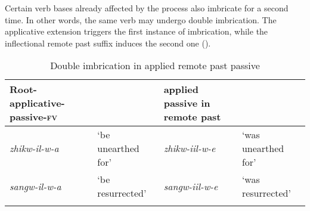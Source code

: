 \documentclass[output=paper]{langsci/langscibook}
\begin{document}
\begin{table}

\caption{Imbrication with vowel lengthening in remote past passive}
\label{tab:26.kawasha}

\end{table}

Certain verb bases already affected by the process also imbricate for a second time. In other words, the same verb may undergo double imbrication. The applicative extension triggers the first instance of imbrication, while the inflectional remote past suffix induces the second one ().

\begin{table} 
\small
\begin{tabularx}{\textwidth}{XlXl}
\lsptoprule
Root-applicative-passive-\textsc{fv} &  & applied passive in remote past & \\
\midrule
\textit{zhikw-il-w-a} & `be unearthed for' & \textit{zhikw-iil-w-e} & `was unearthed for' \\
\textit{sangw-il-w-a} & `be resurrected' & \textit{sangw-iil-w-e} & `was resurrected' \\

\lspbottomrule
\end{tabularx} 

\caption{Double imbrication in applied remote past passive}
\label{tab:27.kawasha}

\end{table}
\end{document}
